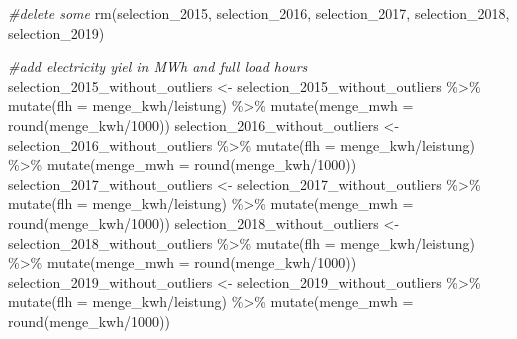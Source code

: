 \documentclass[a4paper,11pt]{article}
\newenvironment{Shaded}{\begin{snugshade}}{\end{snugshade}}
\newcommand{\AttributeTok}[1]{\textcolor[rgb]{0.77,0.63,0.00}{#1}}
\newcommand{\CommentTok}[1]{\textcolor[rgb]{0.56,0.35,0.01}{\textit{#1}}}
\newcommand{\DecValTok}[1]{\textcolor[rgb]{0.00,0.00,0.81}{#1}}
\newcommand{\FunctionTok}[1]{\textcolor[rgb]{0.00,0.00,0.00}{#1}}
\newcommand{\NormalTok}[1]{#1}
\newcommand{\OtherTok}[1]{\textcolor[rgb]{0.56,0.35,0.01}{#1}}
\newcommand{\SpecialCharTok}[1]{\textcolor[rgb]{0.00,0.00,0.00}{#1}}
\begin{document}
\begin{Shaded}
\begin{Highlighting}[]
\CommentTok{\#delete some}
\FunctionTok{rm}\NormalTok{(selection\_2015, selection\_2016, selection\_2017, selection\_2018,}
\NormalTok{   selection\_2019)}

\CommentTok{\#add electricity yiel in MWh and full load hours }
\NormalTok{selection\_2015\_without\_outliers }\OtherTok{\textless{}{-}}\NormalTok{ selection\_2015\_without\_outliers }\SpecialCharTok{\%\textgreater{}\%} 
  \FunctionTok{mutate}\NormalTok{(}\AttributeTok{flh =}\NormalTok{ menge\_kwh}\SpecialCharTok{/}\NormalTok{leistung) }\SpecialCharTok{\%\textgreater{}\%}
  \FunctionTok{mutate}\NormalTok{(}\AttributeTok{menge\_mwh =} \FunctionTok{round}\NormalTok{(menge\_kwh}\SpecialCharTok{/}\DecValTok{1000}\NormalTok{))}
\NormalTok{selection\_2016\_without\_outliers }\OtherTok{\textless{}{-}}\NormalTok{ selection\_2016\_without\_outliers }\SpecialCharTok{\%\textgreater{}\%} 
  \FunctionTok{mutate}\NormalTok{(}\AttributeTok{flh =}\NormalTok{ menge\_kwh}\SpecialCharTok{/}\NormalTok{leistung) }\SpecialCharTok{\%\textgreater{}\%}
  \FunctionTok{mutate}\NormalTok{(}\AttributeTok{menge\_mwh =} \FunctionTok{round}\NormalTok{(menge\_kwh}\SpecialCharTok{/}\DecValTok{1000}\NormalTok{))}
\NormalTok{selection\_2017\_without\_outliers }\OtherTok{\textless{}{-}}\NormalTok{ selection\_2017\_without\_outliers }\SpecialCharTok{\%\textgreater{}\%} 
  \FunctionTok{mutate}\NormalTok{(}\AttributeTok{flh =}\NormalTok{ menge\_kwh}\SpecialCharTok{/}\NormalTok{leistung) }\SpecialCharTok{\%\textgreater{}\%}
  \FunctionTok{mutate}\NormalTok{(}\AttributeTok{menge\_mwh =} \FunctionTok{round}\NormalTok{(menge\_kwh}\SpecialCharTok{/}\DecValTok{1000}\NormalTok{))}
\NormalTok{selection\_2018\_without\_outliers }\OtherTok{\textless{}{-}}\NormalTok{ selection\_2018\_without\_outliers }\SpecialCharTok{\%\textgreater{}\%} 
  \FunctionTok{mutate}\NormalTok{(}\AttributeTok{flh =}\NormalTok{ menge\_kwh}\SpecialCharTok{/}\NormalTok{leistung) }\SpecialCharTok{\%\textgreater{}\%}
  \FunctionTok{mutate}\NormalTok{(}\AttributeTok{menge\_mwh =} \FunctionTok{round}\NormalTok{(menge\_kwh}\SpecialCharTok{/}\DecValTok{1000}\NormalTok{))}
\NormalTok{selection\_2019\_without\_outliers }\OtherTok{\textless{}{-}}\NormalTok{ selection\_2019\_without\_outliers }\SpecialCharTok{\%\textgreater{}\%} 
  \FunctionTok{mutate}\NormalTok{(}\AttributeTok{flh =}\NormalTok{ menge\_kwh}\SpecialCharTok{/}\NormalTok{leistung) }\SpecialCharTok{\%\textgreater{}\%}
  \FunctionTok{mutate}\NormalTok{(}\AttributeTok{menge\_mwh =} \FunctionTok{round}\NormalTok{(menge\_kwh}\SpecialCharTok{/}\DecValTok{1000}\NormalTok{))}


\end{Highlighting}
\end{Shaded}
\end{document}
